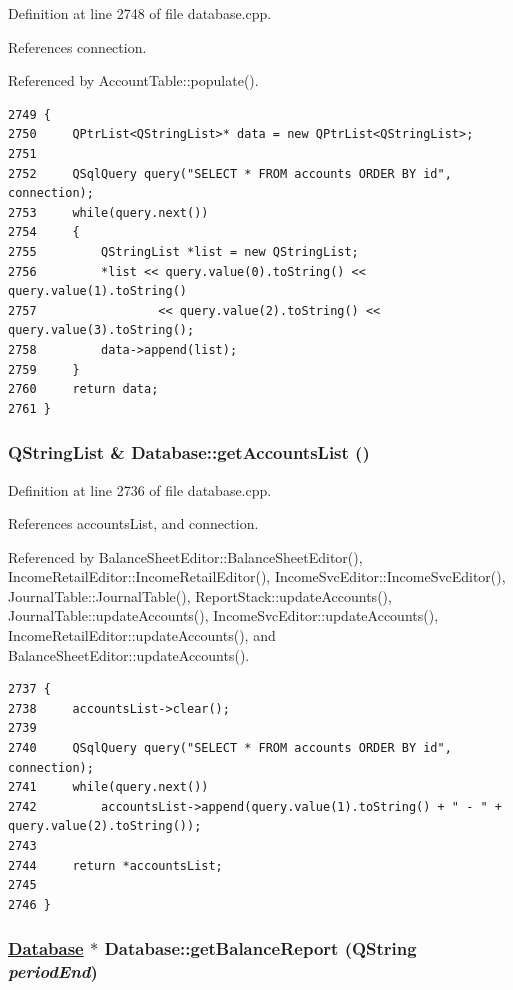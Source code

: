 Definition at line 2748 of file database.cpp.

References connection.

Referenced by Account\-Table::populate().

\footnotesize\begin{verbatim}2749 {
2750     QPtrList<QStringList>* data = new QPtrList<QStringList>;
2751     
2752     QSqlQuery query("SELECT * FROM accounts ORDER BY id", connection);
2753     while(query.next())
2754     {
2755         QStringList *list = new QStringList;
2756         *list << query.value(0).toString() << query.value(1).toString()
2757                 << query.value(2).toString() << query.value(3).toString();
2758         data->append(list);
2759     }
2760     return data;
2761 }
\end{verbatim}\normalsize 


\hypertarget{classDatabase_a36}{
\subsubsection[getAccountsList]{\setlength{\rightskip}{0pt plus 5cm}QString\-List \& Database::get\-Accounts\-List ()}}
\label{classDatabase_a36}


Definition at line 2736 of file database.cpp.

References accounts\-List, and connection.

Referenced by Balance\-Sheet\-Editor::Balance\-Sheet\-Editor(), Income\-Retail\-Editor::Income\-Retail\-Editor(), Income\-Svc\-Editor::Income\-Svc\-Editor(), Journal\-Table::Journal\-Table(), Report\-Stack::update\-Accounts(), Journal\-Table::update\-Accounts(), Income\-Svc\-Editor::update\-Accounts(), Income\-Retail\-Editor::update\-Accounts(), and Balance\-Sheet\-Editor::update\-Accounts().

\footnotesize\begin{verbatim}2737 {
2738     accountsList->clear();
2739     
2740     QSqlQuery query("SELECT * FROM accounts ORDER BY id", connection);
2741     while(query.next())
2742         accountsList->append(query.value(1).toString() + " - " + query.value(2).toString());
2743 
2744     return *accountsList;
2745     
2746 }
\end{verbatim}\normalsize 


\hypertarget{classDatabase_a24}{
\subsubsection[getBalanceReport]{\setlength{\rightskip}{0pt plus 5cm}\hyperlink{classDatabase}{Database} $\ast$ Database::get\-Balance\-Report (QString {\em period\-End})}}
\label{classDatabase_a24}


